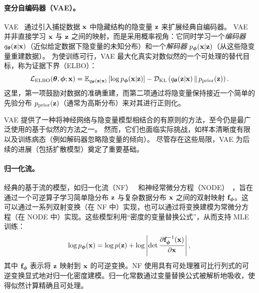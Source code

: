 \paragraph{变分自编码器（VAE）。}
VAE~\citep{kingma2013auto} 通过引入捕捉数据 ${\mathbf{x}}$ 中隐藏结构的隐变量 ${\mathbf{z}}$ 来扩展经典自编码器。
VAE 并非直接学习 ${\mathbf{x}}$ 与 ${\mathbf{z}}$ 之间的映射，而是采用概率视角：它同时学习一个\emph{编码器} $q_{{\bm{\theta}}}({\mathbf{z}}|{\mathbf{x}})$（近似给定数据下隐变量的未知分布）和一个\emph{解码器} $p_{{\bm{\phi}}}({\mathbf{x}}|{\mathbf{z}})$（从这些隐变量重建数据）。
为使训练可行，VAE 最大化真实对数似然的一个可处理的替代目标，称为证据下界（ELBO）：
\begin{equation*}
    \mathcal{L}_{\text{ELBO}}({\bm{\theta}}, {\bm{\phi}}; {\mathbf{x}}) 
    = \mathbb{E}_{q_{{\bm{\theta}}}({\mathbf{z}} | {\mathbf{x}})} \left[ \log p_{{\bm{\phi}}}({\mathbf{x}} | {\mathbf{z}}) \right] 
    - \mathcal D_{\mathrm{KL}} \left( q_{{\bm{\theta}}}({\mathbf{z}} | {\mathbf{x}}) \,\|\, p_{\mathrm{prior}}({\mathbf{z}}) \right).
\end{equation*}
这里，第一项鼓励对数据的准确重建，而第二项通过将隐变量保持接近一个简单的先验分布 $p_{\mathrm{prior}}({\mathbf{z}})$（通常为高斯分布）来对其进行正则化。

VAE 提供了一种将神经网络与隐变量模型相结合的有原则的方法，至今仍是最广泛使用的基于似然的方法之一。
然而，它们也面临实际挑战，如样本清晰度有限以及训练病态（例如解码器忽略隐变量的倾向）。
尽管存在这些局限，VAE 为后续的进展（包括扩散模型）奠定了重要基础。






\paragraph{归一化流。}
经典的基于流的模型，如归一化流（NF）~\citep{rezende2015variational} 和神经常微分方程（NODE）~\citep{chen2018neural}，旨在通过一个可逆算子学习简单隐分布 $ {\mathbf{z}} $ 与复杂数据分布 $ {\mathbf{x}} $ 之间的双射映射 ${\mathbf{f}}_{\bm{\phi}}$。这可以通过一系列双射变换（在 NF 中）实现，也可以通过将变换建模为常微分方程（在 NODE 中）实现。这些模型利用“密度的变量替换公式”，从而支持 MLE 训练：
\begin{equation*}
    \log p_{\bm{\phi}}({\mathbf{x}}) = \log p({\mathbf{z}}) + \log \left| \det \frac{\partial {\mathbf{f}}_{\bm{\phi}}^{-1}({\mathbf{x}})}{\partial {\mathbf{x}}} \right|,
\end{equation*}
其中 $ {\mathbf{f}}_{\bm{\phi}} $ 表示将 $ {\mathbf{z}} $ 映射到 $ {\mathbf{x}} $ 的可逆变换。NF 使用具有可处理雅可比行列式的可逆变换显式地对归一化密度建模。归一化常数通过变量替换公式被解析地吸收，使得似然计算精确且可处理。

